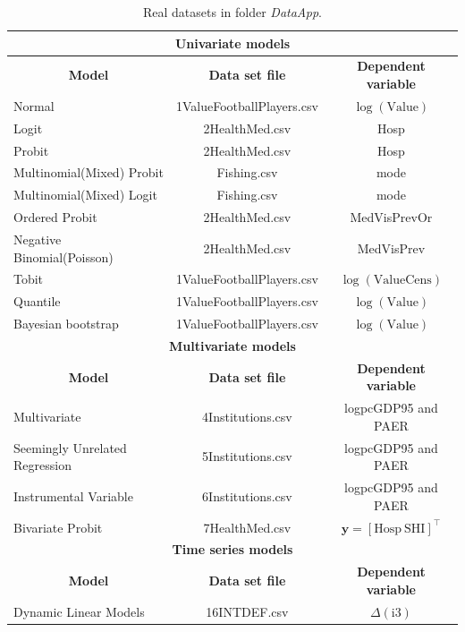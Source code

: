 	\begin{table}[!ht]
		\centering
		\caption{Real datasets in folder \textit{DataApp}.}
		\label{tab:appdata}
		\scriptsize
		\begin{tabular}{|l|c|c|}
			\hline 
	\multicolumn{3}{|c|}{\textbf{Univariate models}} \\
	\hline  
	 \multicolumn{1}{|c|}{\textbf{Model}} & \multicolumn{1}{c}{\textbf{Data set file}} & \multicolumn{1}{|c|}{\textbf{Dependent variable}} \\ 
	 \hline 
	Normal & 1ValueFootballPlayers.csv & $\log(\text{Value})$ \\
	Logit & 2HealthMed.csv & Hosp\\
	Probit & 2HealthMed.csv & Hosp \\
	Multinomial(Mixed) Probit  & Fishing.csv & mode \\
	Multinomial(Mixed) Logit  & Fishing.csv & mode \\
	Ordered Probit  &  2HealthMed.csv & MedVisPrevOr\\
	Negative Binomial(Poisson)   & 2HealthMed.csv & MedVisPrev\\
	Tobit   & 1ValueFootballPlayers.csv & $\log(\text{ValueCens})$ \\
	Quantile &  1ValueFootballPlayers.csv & $\log(\text{Value})$ \\
	Bayesian bootstrap & 1ValueFootballPlayers.csv & $\log(\text{Value})$  \\
	\hline 
		\multicolumn{3}{|c|}{\textbf{Multivariate models}} \\
	\hline  
	\multicolumn{1}{|c|}{\textbf{Model}} & \multicolumn{1}{c}{\textbf{Data set file}} & \multicolumn{1}{|c|}{\textbf{Dependent variable}}\\ 
	\hline
	Multivariate   & 4Institutions.csv & logpcGDP95 and PAER \\
	Seemingly Unrelated Regression & 5Institutions.csv & logpcGDP95 and PAER\\
	Instrumental Variable  & 6Institutions.csv & logpcGDP95 and PAER \\
	Bivariate Probit   & 7HealthMed.csv & $\bm{y}=\left[\text{Hosp} \ \text{SHI}\right]^{\top}$\\
	\hline
	\multicolumn{3}{|c|}{\textbf{Time series models}} \\
	\hline  
	\multicolumn{1}{|c|}{\textbf{Model}} & \multicolumn{1}{c}{\textbf{Data set file}} & \multicolumn{1}{|c|}{\textbf{Dependent variable}} \\ 
	\hline
	Dynamic Linear Models & 16INTDEF.csv  & $\Delta(\text{i3})$ \\

\end{tabular}
\end{table}
